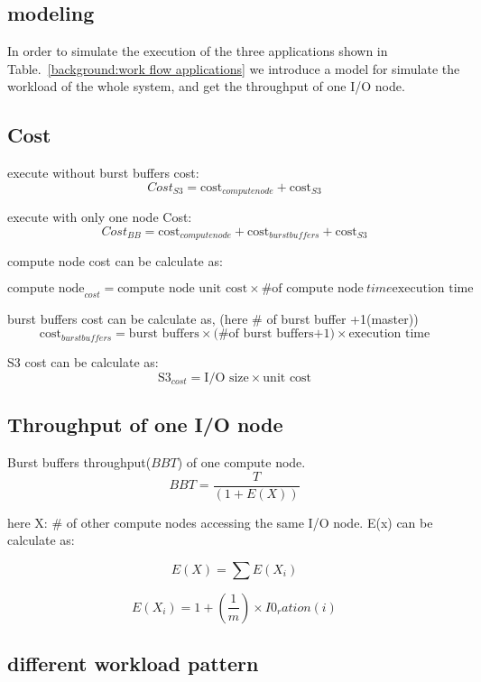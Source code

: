 \subsection{modeling}
\label{sec:modeling}

In order to simulate the execution of the three applications shown in Table.~\ref{background:work
flow applications}
we introduce a model for simulate the workload of the whole system, and get the throughput of one
I/O node.
\subsection{Cost}

execute without burst buffers cost:
\begin{equation}
Cost_{S3} = \text{cost}_{compute node}+\text{cost}_{S3}
\end{equation}

execute with only one node Cost:
\begin{equation}
Cost_{BB} = \text{cost}_{compute node}+\text{cost}_{burst buffers}+\text{cost}_{S3}
\end{equation}

compute node cost can be calculate as:

\begin{equation}
\text{compute node}_{cost} = \text{compute node unit cost} \times \text{\# of compute
node} \ time \text{execution time}
\end{equation}

burst buffers cost can be calculate as, (here \# of burst buffer +1(master))
\begin{equation}
\text{cost}_{burst buffers} = \text{burst buffers} \times \text{(\# of burst buffers+1)} \times
\text{execution time}
\end{equation}

S3 cost can be calculate as:
\begin{equation}
\text{S3}_{cost} = \text{I/O size}\times \text{unit cost}
\end{equation}


\subsection{Throughput of one I/O node}
Burst buffers throughput($BBT$) of one compute node.
\begin{equation}
BBT = \frac{T}{(1 + E(X))}
\end{equation}

here X: \# of other compute nodes accessing the same I/O node.
E(x) can be calculate as:

\begin{equation}
E(X) = \sum E(X_i)
\end{equation}

\begin{equation}
E(X_i) = 1 + (\frac{1}{m}) \times I0_ration(i)
\end{equation}



\subsection{different workload pattern}
